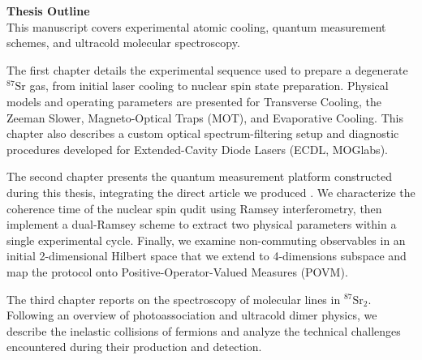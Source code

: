 \vspace{2em}

\textbf{Thesis Outline}\\
This manuscript covers experimental atomic cooling, quantum measurement schemes, and ultracold molecular spectroscopy.

The first chapter details the experimental sequence used to prepare a degenerate $^{87}\text{Sr}$ gas, from initial laser cooling to nuclear spin state preparation. Physical models and operating parameters are presented for Transverse Cooling, the Zeeman Slower, Magneto-Optical Traps (MOT), and Evaporative Cooling. This chapter also describes a custom optical spectrum-filtering setup and diagnostic procedures developed for Extended-Cavity Diode Lasers (ECDL, MOGlabs).

The second chapter presents the quantum measurement platform constructed during this thesis, integrating the direct article we produced \cite{ahmed_coherent_2025}. We characterize the coherence time of the nuclear spin qudit using Ramsey interferometry, then implement a dual-Ramsey scheme to extract two physical parameters within a single experimental cycle. Finally, we examine non-commuting observables in an initial 2-dimensional Hilbert space that we extend to 4-dimensions subspace and map the protocol onto Positive-Operator-Valued Measures (POVM).

The third chapter reports on the spectroscopy of molecular lines in $^{87}\text{Sr}_2$. Following an overview of photoassociation and ultracold dimer physics, we describe the inelastic collisions of fermions and analyze the technical challenges encountered during their production and detection.